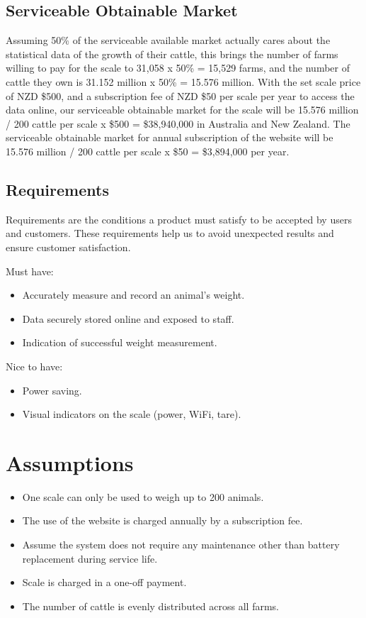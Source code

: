 \subsection{Serviceable Obtainable Market}

Assuming 50\% of the serviceable available market actually cares about the statistical data of the growth of their cattle, this brings the number of farms willing to pay for the scale to 31,058 x 50\% = 15,529 farms, and the number of cattle they own is 31.152 million x 50\% = 15.576 million.
With the set scale price of NZD \$500, and a subscription fee of NZD \$50 per scale per year to access the data online, our serviceable obtainable market for the scale will be 15.576 million / 200 cattle per scale x \$500 = \$38,940,000 in Australia and New Zealand. The serviceable obtainable market for annual subscription of the website will be 15.576 million / 200 cattle per scale x \$50 = \$3,894,000 per year.

\subsection{Requirements}

Requirements are the conditions a product must satisfy to be accepted by users and customers. These requirements help us to avoid unexpected results and ensure customer satisfaction.

Must have:
\begin{itemize}
    \item Accurately measure and record an animal's weight.
    \item Data securely stored online and exposed to staff.
    \item Indication of successful weight measurement.
\end{itemize}

Nice to have:
\begin{itemize}
    \item Power saving.
    \item Visual indicators on the scale (power, WiFi, tare).
\end{itemize}

\section{Assumptions}
\begin{itemize}
    \item One scale can only be used to weigh up to 200 animals.
    \item The use of the website is charged annually by a subscription fee.
    \item Assume the system does not require any maintenance other than battery replacement during service life.
    \item Scale is charged in a one-off payment.
    \item The number of cattle is evenly distributed across all farms.
\end{itemize}

